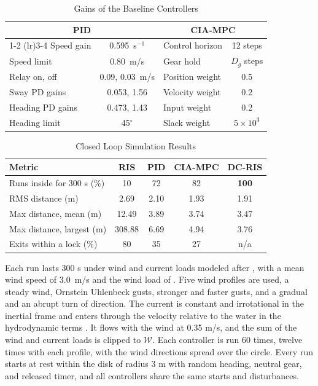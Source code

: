 \documentclass[lettersize,journal]{IEEEtran}
\newcommand{\calW}{\mathcal{W}}
\newcommand{\pid}{PID\xspace}
\newcommand{\ciampc}{CIA-MPC\xspace}
\newcommand{\risnd}{RIS\xspace}
\newcommand{\dcris}{DC-RIS\xspace}
\begin{document}
\begin{table}[!t]
\renewcommand{\arraystretch}{1.15}
\caption{Gains of the Baseline Controllers}
\label{tab_gains}
\centering
\footnotesize
\color{red}
\setlength{\tabcolsep}{3pt}
\begin{tabular}{lclc}
\toprule
\multicolumn{2}{c}{\pid} & \multicolumn{2}{c}{\ciampc} \\
\cmidrule(lr){1-2} \cmidrule(lr){3-4}
Speed gain & 0.595~s$^{-1}$ & Control horizon & 12 steps \\
Speed limit & 0.80~m/s & Gear hold & $D_g$ steps \\
Relay on, off & 0.09, 0.03~m/s & Position weight & 0.5 \\
Sway PD gains & 0.053, 1.56 & Velocity weight & 0.2 \\
Heading PD gains & 0.473, 1.43 & Input weight & 0.2 \\
Heading limit & 45$^\circ$ & Slack weight & $5\times10^{3}$ \\
\bottomrule
\end{tabular}
\end{table}




\begin{table}[!t]
\renewcommand{\arraystretch}{1.15}
\caption{Closed Loop Simulation Results}
\label{tab_sim}
\centering
\footnotesize
\setlength{\tabcolsep}{3pt}
\begin{tabular}{>{\raggedright\arraybackslash}p{}cccc}
\toprule
Metric & \risnd & \pid & \ciampc & \textbf{\dcris} \\
\midrule
Runs inside for 300 s (\%) & 10 & 72 & 82 & \textbf{100} \\
RMS distance (m) & 2.69 & 2.10 & 1.93 & 1.91 \\
Max distance, mean (m) & 12.49 & 3.89 & 3.74 & 3.47 \\
Max distance, largest (m) & 308.88 & 6.69 & 4.94 & 3.76 \\
Exits within a lock (\%) & 80 & 35 & 27 & n/a \\
\bottomrule
\end{tabular}
\end{table}






Each run lasts 300 s under wind and current loads modeled after \cite[Ch.~8]{fossen2011}, with a mean wind speed of 3.0~m/s and the wind load of \cite[Sec.~8.1]{fossen2011}. Five wind profiles are used, a steady wind, Ornstein Uhlenbeck gusts, stronger and faster gusts, and a gradual and an abrupt turn of direction. The current is constant and irrotational in the inertial frame and enters through the velocity relative to the water in the hydrodynamic terms \cite[Sec.~8.3]{fossen2011}. It flows with the wind at 0.35 m/s, and the sum of the wind and current loads is clipped to $\calW$. Each controller is run 60 times, twelve times with each profile, with the wind directions spread over the circle. Every run starts at rest within the disk of radius 3 m with random heading, neutral gear, and released timer, and all controllers share the same starts and disturbances.
\end{document}
